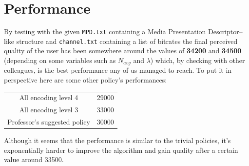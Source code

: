 \documentclass[10pt, a4paper]{article}
\begin{document}
    \section{Performance}
    By testing with the given \texttt{MPD.txt} containing a
    Media Presentation Descriptor--like structure and 
    \texttt{channel.txt} containing a list of bitrates the
    final perceived quality of the user has been somewhere around
    the values of \textbf{34200} and \textbf{34500} (depending on some
    variables such as $N_{avg}$ and $\lambda$) which,
    by checking with other colleagues, is the best performance
    any of us managed to reach.
    To put it in perspective here are some other policy's performances:
    \begin{center}
        \begin{tabular}{ |c|c| } 
            \hline
            All encoding level 4 & 29000 \\ 
            All encoding level 3 & 33000 \\ 
            Professor's suggested policy & 30000 \\ 
            \hline
        \end{tabular}
    \end{center}
    Although it seems that the performance is similar to the trivial
    policies, it's exponentially harder to improve the algorithm and 
    gain quality after a certain value around 33500.
\end{document}
